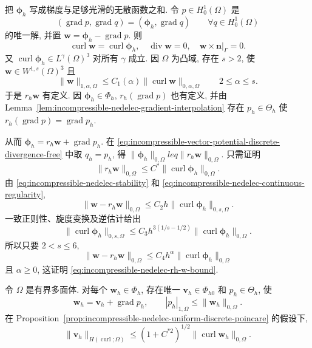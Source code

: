 \begin{Proof}
把 $\boldsymbol\phi_h$ 写成梯度与足够光滑的无散函数之和.
令 $p\in H_0^1(\Omega)$ 是
\[
(\operatorname{grad}p,\operatorname{grad}q)
=(\boldsymbol\phi_h,\operatorname{grad}q)
\qquad\forall q\in H_0^1(\Omega)
\]
的唯一解, 并置
$\mathbf w=\boldsymbol\phi_h-\operatorname{grad}p$.
则
\[
\operatorname{curl}\mathbf w
=\operatorname{curl}\boldsymbol\phi_h,
\quad\operatorname{div}\mathbf w=0,
\quad\mathbf w\times\mathbf n|_\Gamma=0.
\]
又 $\operatorname{curl}\boldsymbol\phi_h\in L^\gamma(\Omega)^3$
对所有 $\gamma$ 成立. 因 $\Omega$ 为凸域, 存在 $s>2$, 使
$\mathbf w\in W^{1,s}(\Omega)^3$ 且
\begin{equation}\label{eq:incompressible-nedelec-continuous-regularity}
\|\mathbf w\|_{1,\alpha,\Omega}
\leq C_1(\alpha)\|\operatorname{curl}\mathbf w\|_{0,\alpha,\Omega}
\qquad 2\leq\alpha\leq s.
\end{equation}
于是 $r_h\mathbf w$ 有定义. 因
$\boldsymbol\phi_h\in\Phi_h$,
$r_h(\operatorname{grad}p)$ 也有定义,
并由 Lemma~\ref{lem:incompressible-nedelec-gradient-interpolation}
存在 $p_h\in\Theta_h$ 使
$r_h(\operatorname{grad}p)=\operatorname{grad}p_h$.

从而
$\boldsymbol\phi_h=r_h\mathbf w+\operatorname{grad}p_h$.
在 \eqref{eq:incompressible-vector-potential-discrete-divergence-free}
中取 $q_h=p_h$, 得
$\|\boldsymbol\phi_h\|_{0,\Omega}leq\|r_h\mathbf w\|_{0,\Omega}$.
只需证明
\begin{equation}\label{eq:incompressible-nedelec-rh-w-bound}
\|r_h\mathbf w\|_{0,\Omega}
\leq C^*\|\operatorname{curl}\boldsymbol\phi_h\|_{0,\Omega}.
\end{equation}
由 \eqref{eq:incompressible-nedelec-stability} 和
\eqref{eq:incompressible-nedelec-continuous-regularity},
\[
\|\mathbf w-r_h\mathbf w\|_{0,\Omega}
\leq C_2h\|\operatorname{curl}\boldsymbol\phi_h\|_{0,s,\Omega}.
\]
一致正则性、旋度变换及逆估计给出
\[
\|\operatorname{curl}\boldsymbol\phi_h\|_{0,s,\Omega}
\leq C_3h^{3(1/s-1/2)}
\|\operatorname{curl}\boldsymbol\phi_h\|_{0,\Omega}.
\]
所以只要 $2<s\leq6$,
\[
\|\mathbf w-r_h\mathbf w\|_{0,\Omega}
\leq C_4h^\alpha
\|\operatorname{curl}\boldsymbol\phi_h\|_{0,\Omega}
\]
且 $\alpha\geq0$, 这证明
\eqref{eq:incompressible-nedelec-rh-w-bound}.
\end{Proof}

\begin{Corollary}\label{cor:incompressible-nedelec-discrete-decomposition}
令 $\Omega$ 是有界多面体. 对每个
$\mathbf w_h\in\Phi_h$, 存在唯一
$\mathbf v_h\in\Phi_{h0}$ 和 $p_h\in\Theta_h$, 使
\begin{equation}\label{eq:incompressible-nedelec-discrete-decomposition}
\mathbf w_h=\mathbf v_h+\operatorname{grad}p_h,
\qquad |p_h|_{1,\Omega}\leq\|\mathbf w_h\|_{0,\Omega}.
\end{equation}
在 Proposition~\ref{prop:incompressible-nedelec-uniform-discrete-poincare}
的假设下,
\begin{equation}\label{eq:incompressible-nedelec-discrete-divfree-bound}
\|\mathbf v_h\|_{H(\operatorname{curl};\Omega)}
\leq(1+C^{*2})^{1/2}
\|\operatorname{curl}\mathbf w_h\|_{0,\Omega}.
\end{equation}
\end{Corollary}

